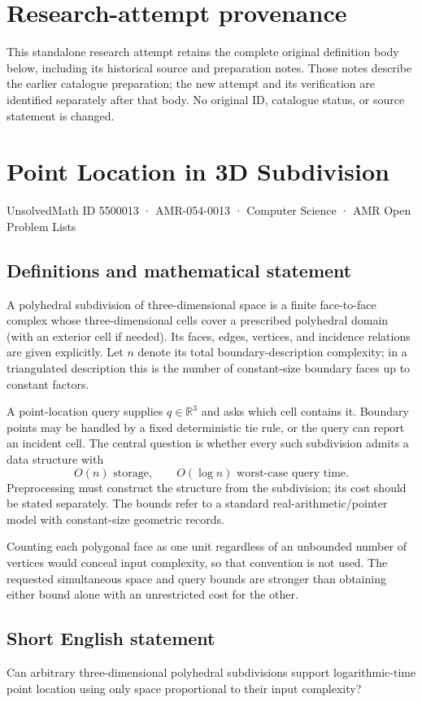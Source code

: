\documentclass[11pt,a4paper]{article}
\begin{document}
\section*{Research-attempt provenance}
This standalone research attempt retains the complete original definition body below,
including its historical source and preparation notes. Those notes describe the
earlier catalogue preparation; the new attempt and its verification are identified
separately after that body. No original ID, catalogue status, or source statement is changed.

\section*{Point Location in 3D Subdivision}\label{5500013}
{\small UnsolvedMath ID 5500013 · AMR-054-0013 · Computer Science · AMR Open Problem Lists}
\subsection{Definitions and mathematical statement}
A polyhedral subdivision of three-dimensional space is a finite
face-to-face complex whose three-dimensional cells cover a prescribed
polyhedral domain (with an exterior cell if needed). Its faces, edges,
vertices, and incidence relations are given explicitly. Let $n$ denote
its total boundary-description complexity; in a triangulated description
this is the number of constant-size boundary faces up to constant factors.

A point-location query supplies $q\in\mathbb R^3$ and asks which cell
contains it. Boundary points may be handled by a fixed deterministic
tie rule, or the query can report an incident cell. The central question
is whether every such subdivision admits a data structure with
\[
                    O(n)\text{ storage},\qquad
                    O(\log n)\text{ worst-case query time}.
\]
Preprocessing must construct the structure from the subdivision; its
cost should be stated separately. The bounds refer to a standard
real-arithmetic/pointer model with constant-size geometric records.

Counting each polygonal face as one unit regardless of an unbounded
number of vertices would conceal input complexity, so that convention
is not used. The requested simultaneous space and query bounds are
stronger than obtaining either bound alone with an unrestricted cost
for the other.
\subsection{Short English statement}
Can arbitrary three-dimensional polyhedral subdivisions support
logarithmic-time point location using only space proportional to their
input complexity?
\end{document}
